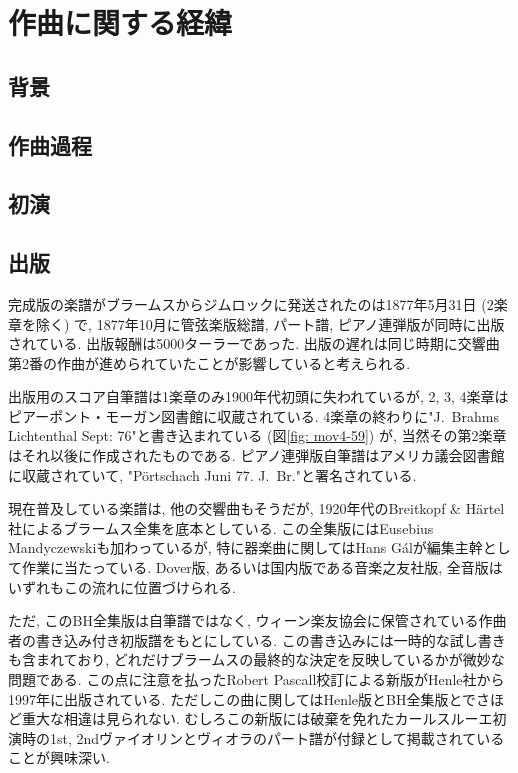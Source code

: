 
\chapter{作曲に関する経緯}

\section{背景}

\section{作曲過程}

\section{初演}

\section{出版}

完成版の楽譜がブラームスからジムロックに発送されたのは1877年5月31日 (2楽章を除く) で,
1877年10月に管弦楽版総譜, パート譜, ピアノ連弾版が同時に出版されている. 出版報酬は5000ターラーであった. 
出版の遅れは同じ時期に交響曲第2番の作曲が進められていたことが影響していると考えられる.

出版用のスコア自筆譜は1楽章のみ1900年代初頭に失われているが, 2, 3, 4楽章はピアーポント・モーガン図書館に収蔵されている.
4楽章の終わりに"J.~Brahms Lichtenthal Sept: 76"と書き込まれている (図\ref{fig: mov4-59}) が, 当然その第2楽章はそれ以後に作成されたものである.
ピアノ連弾版自筆譜はアメリカ議会図書館に収蔵されていて, "Pörtschach Juni 77. J.~Br."と署名されている.

現在普及している楽譜は, 他の交響曲もそうだが, 1920年代のBreitkopf \& Härtel社によるブラームス全集を底本としている.
この全集版にはEusebius Mandyczewskiも加わっているが, 特に器楽曲に関してはHans Gálが編集主幹として作業に当たっている.
Dover版, あるいは国内版である音楽之友社版, 全音版はいずれもこの流れに位置づけられる.

ただ, このBH全集版は自筆譜ではなく, ウィーン楽友協会に保管されている作曲者の書き込み付き初版譜をもとにしている.
この書き込みには一時的な試し書きも含まれており, どれだけブラームスの最終的な決定を反映しているかが微妙な問題である.
この点に注意を払ったRobert Pascall校訂による新版がHenle社から1997年に出版されている.
ただしこの曲に関してはHenle版とBH全集版とでさほど重大な相違は見られない.
むしろこの新版には破棄を免れたカールスルーエ初演時の1st, 2ndヴァイオリンとヴィオラのパート譜が付録として掲載されていることが興味深い.

